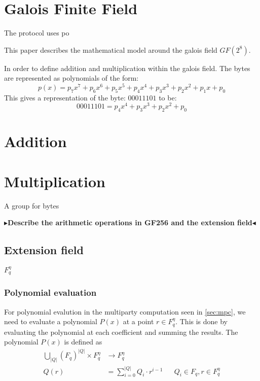 \documentclass[twoside,11pt,openright]{report}
\theoremstyle{definition}
\theoremstyle{plain}
\newcommand{\todo}[1]{{\color[rgb]{.5,0,0}\textbf{$\blacktriangleright$#1$\blacktriangleleft$}}}
\begin{document}
\section{Galois Finite Field}
\label{sec:gf256}
The protocol uses po

This paper \cite{brownadvanced} describes the mathematical model around the galois field $GF(2^8)$.

In order to define addition and multiplication within the galois field. The bytes are represented as polynomials of the form:
\begin{equation}
  \label{eq:poly}
  p(x) = p_7x^7 + p_6x^6 + p_5x^5 + p_4x^4 + p_3x^3 + p_2x^2 + p_1x + p_0
\end{equation}
This gives a representation of the byte: ${00011101}$ to be:
\begin{equation}
  \label{eq:example_poly}
  00011101 = p_4x^4 + p_3x^3 + p_2x^2 + p_0
\end{equation}


\section{Addition}
\section{Multiplication}

A group for bytes

\todo{Describe the arithmetic operations in GF256 and the extension field}


\subsection{Extension field}
$F_q^\eta$

\subsubsection{Polynomial evaluation}
For polynomial evalution in the multiparty computation seen in \autoref{sec:mpc}, we need to evaluate a polynomial $P(x)$ at a point $r \in F_q^\eta$. This is done by evaluating the polynomial at each coefficient and summing the results. The polynomial $P(x)$ is defined as
\begin{align}
  \textstyle\bigcup_{|Q|}(F_q)^{|Q|} \times F_q^\eta & \rightarrow F_q^\eta                 \nonumber                                  \\
  Q(r)                                               & = \textstyle\sum_{i=0}^{|Q|} Q_i \cdot r^{i-1} &  & Q_i \in F_q, r \in F_q^\eta
  \label{eq:mpcpoly}
\end{align}
\end{document}
